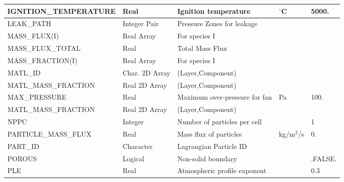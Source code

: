 \documentclass[11pt]{book}
\begin{document}
\begin{longtable}{|l|l|l|l|l|}
{\ct IGNITION\_TEMPERATURE}           & Real            & Ignition temperature              & $^\circ$C           & 5000.                   \\ \hline
{\ct LEAK\_PATH}                      & Integer Pair    & Pressure Zones for leakage        &                     &                         \\ \hline
{\ct MASS\_FLUX(I)}                   & Real Array      & For species {\ct I}               &                     &                         \\ \hline
{\ct MASS\_FLUX\_TOTAL}               & Real            & Total Mass Flux                   &                     &                         \\ \hline
{\ct MASS\_FRACTION(I)}               & Real Array      & For species {\ct I}               &                     &                         \\ \hline
{\ct MATL\_ID}                        & Char. 2D Array  & (Layer,Component)                 &                     &                         \\ \hline
{\ct MATL\_MASS\_FRACTION}            & Real 2D Array   & (Layer,Component)                 &                     &                         \\ \hline
{\ct MAX\_PRESSURE }                  & Real            & Maximum over-pressure for fan     & Pa                  & 100.                    \\ \hline
{\ct MATL\_MASS\_FRACTION}            & Real 2D Array   & (Layer,Component)                 &                     &                         \\ \hline
{\ct NPPC}                            & Integer         & Number of particles per cell      &                     & 1                       \\ \hline
{\ct PARTICLE\_MASS\_FLUX}            & Real            & Mass flux of particles            & kg/m$^2$/s          & 0.                      \\ \hline
{\ct PART\_ID}                        & Character       & Lagrangian Particle ID            &                     &                         \\ \hline
{\ct POROUS}                          & Logical         & Non-solid boundary                &                     & {\ct .FALSE.}           \\ \hline
{\ct PLE}                             & Real            & Atmospheric profile exponent      &                     & 0.3                     \\ \hline

\end{longtable}
\end{document}
